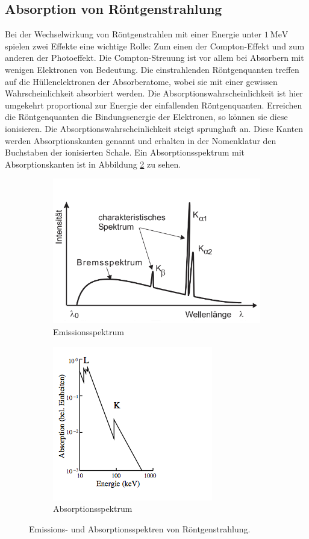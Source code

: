 \subsection{Absorption von Röntgenstrahlung}
Bei der Wechselwirkung von Röntgenstrahlen mit einer Energie unter $\SI{1}{\mega \eV}$
spielen zwei Effekte eine wichtige Rolle: Zum einen der Compton-Effekt und zum anderen
der Photoeffekt. Die Compton-Streuung ist vor allem bei Absorbern mit wenigen Elektronen
von Bedeutung. Die einstrahlenden Röntgenquanten treffen auf die Hüllenelektronen der
Absorberatome, wobei sie mit einer gewissen Wahrscheinlichkeit absorbiert werden.
Die Absorptionswahrscheinlichkeit ist hier umgekehrt proportional zur Energie der einfallenden
Röntgenquanten. Erreichen die Röntgenquanten die Bindungsenergie der Elektronen, so können sie diese ionisieren.
Die Absorptionswahrscheinlichkeit steigt sprunghaft an. Diese Kanten werden Absorptionskanten
genannt und erhalten in der Nomenklatur den Buchstaben der ionisierten Schale. Ein Absorptionsspektrum
mit Absorptionskanten ist in Abbildung \ref{abb1b} zu sehen.
\FloatBarrier
\begin{figure}
  \centering
  \begin{subfigure}{.4\textwidth}
    \centering
  \includegraphics[scale=0.3]{b1.PNG}
  \caption{Emissionsspektrum \cite{Q1}}
  \label{abb1a}
\end{subfigure}
\begin{subfigure}{.4\textwidth}
  \centering
 \includegraphics[scale=0.6]{b2.PNG}
 \caption{Absorptionsspektrum \cite{Q1}}
 \label{abb1b}
 \end{subfigure}
 \caption{Emissions- und Absorptionsspektren von Röntgenstrahlung.}
 \label{abb1}
\end{figure}
